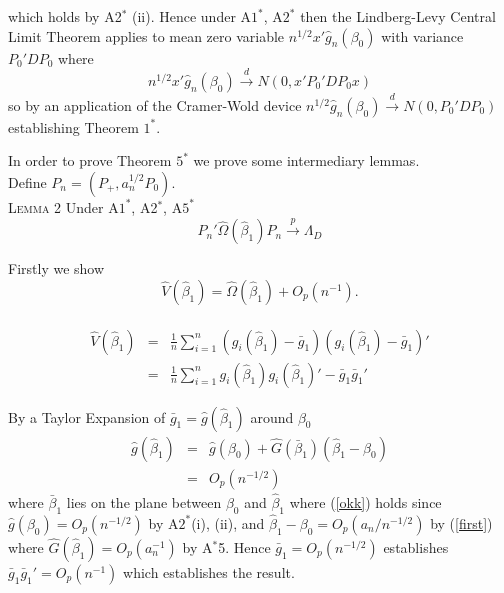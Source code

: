 \documentclass[11pt, fleqn]{article}
\begin{document}
  which holds by A2$^*$ (ii). Hence under A$1^*$, A$2^*$ then the Lindberg-Levy Central Limit Theorem
  applies  to mean zero variable  $n^{1/2}x'\hat{g}_n(\beta_0)$ with variance $P_0'DP_0$   where \begin{equation} n^{1/2}x'\hat{g}_{n}(\beta_0)\overset{d}{\rightarrow} N(0, x'P_0'DP_0x) \end{equation} so by an application of the Cramer-Wold device $n^{1/2}\hat{g}_{n}(\beta_0)\overset{d}{\rightarrow} N(0, P_0'DP_0)$ establishing Theorem $1^*$. \newline

In order to prove Theorem $5^*$ we prove some intermediary lemmas.\\
Define $P_n=(P_+,a_n^{1/2}P_0)$.\\




\textsc{Lemma 2} Under A$1^*$, A2$^*$, A$5^*$\\
\begin{equation}
P_n'\hat{\Omega}(\hat{\beta}_1)P_n \overset{p}{\rightarrow} \Lambda_D
\end{equation}

Firstly we show 
\begin{equation}
\hat{V}(\hat{\beta}_1)=
\hat{\Omega}(\hat{\beta}_1)+O_p(n^{-1}).\end{equation}\\


 \begin{eqnarray}\hat{V}(\hat{\beta}_1)&=&\frac{1}{n}\sum_{i=1}^n(g_i(\hat{\beta}_1)-\bar{g}_1)(g_i(\hat{\beta}_1)-\bar{g}_1)'\\&=&\frac{1}{n}\sum_{i=1}^ng_i(\hat{\beta}_1)g_i(\hat{\beta}_1)'-\bar{g}_1\bar{g}_1' 
 \end{eqnarray}
 




By a Taylor Expansion of $\bar{g}_1=\hat{g}(\hat{\beta}_1)$ around $\beta_0$
\begin{eqnarray} \hat{g}(\hat{\beta}_1)&=&\hat{g}(\beta_0)+\hat{G}(\bar{\beta}_1)(\hat{\beta}_1-\beta_0) \\
&=& O_p(n^{-1/2}) \label{okk}\end{eqnarray}
where $\bar{\beta}_1$ lies on the plane between $\beta_0$ and $\hat{\beta}_1$ where  (\ref{okk}) holds since  $\hat{g}(\beta_0)=O_p(n^{-1/2})$ by A$2^*$(i), (ii), and $\hat{\beta}_1-\beta_0=O_p(a_n/n^{-1/2})$ by (\ref{first}) where $\hat{G}(\hat{\beta}_1)=O_p(a_n^{-1})$ by A$^*$5. 
Hence  $\bar{g}_1=O_p(n^{-1/2})$ establishes  $\bar{g}_1\bar{g}_1'=O_p(n^{-1})$ which establishes the result.\\
\end{document}
